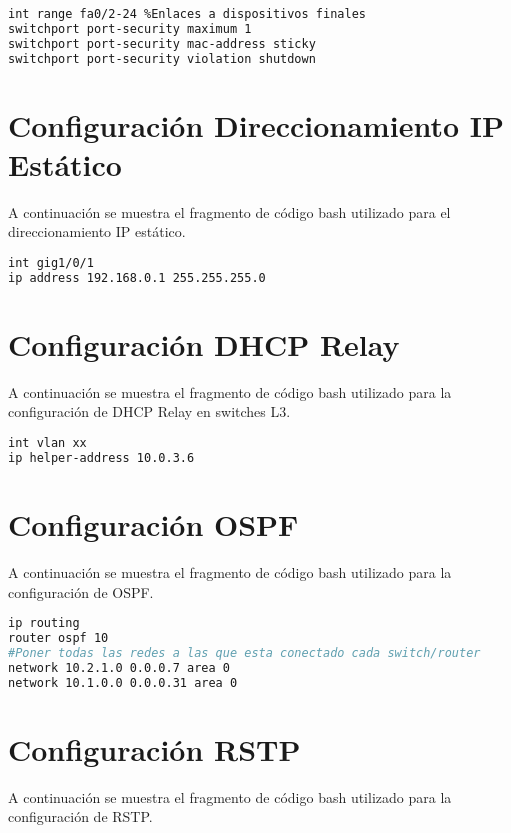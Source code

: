 \begin{lstlisting}[language=Bash, caption={Configuración HSRP en Routers}]
int range fa0/2-24 %Enlaces a dispositivos finales
switchport port-security maximum 1 
switchport port-security mac-address sticky 
switchport port-security violation shutdown 
\end{lstlisting}

\section{Configuración Direccionamiento IP Estático}\label{anexo:estatico}
A continuación se muestra el fragmento de código bash utilizado para el direccionamiento IP estático.

\begin{lstlisting}[language=Bash, caption={Configuración Direccionamiento IP Estático}]
int gig1/0/1
ip address 192.168.0.1 255.255.255.0
\end{lstlisting}

\section{Configuración DHCP Relay}\label{anexo:relay}
A continuación se muestra el fragmento de código bash utilizado para la configuración de DHCP Relay en switches L3.

\begin{lstlisting}[language=Bash, caption={Configuración Direccionamiento IP Estático}]
int vlan xx
ip helper-address 10.0.3.6 
\end{lstlisting}

\section{Configuración OSPF}\label{anexo:ospf}
A continuación se muestra el fragmento de código bash utilizado para la configuración de OSPF.

\begin{lstlisting}[language=Bash, caption={Configuración OSPF}]
ip routing 
router ospf 10  
#Poner todas las redes a las que esta conectado cada switch/router
network 10.2.1.0 0.0.0.7 area 0 
network 10.1.0.0 0.0.0.31 area 0
\end{lstlisting}

\section{Configuración RSTP}\label{anexo:rstp}
A continuación se muestra el fragmento de código bash utilizado para la configuración de RSTP.


